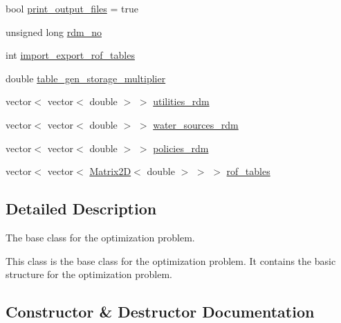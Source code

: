 \begin{DoxyCompactItemize}
bool \mbox{\hyperlink{classProblem_a3372a73270ce989f5d2056cace66215b_a3372a73270ce989f5d2056cace66215b}{print\+\_\+output\+\_\+files}} = true
\item 
unsigned long \mbox{\hyperlink{classProblem_a9e780729b6be5229c5bfa1e38c99cfa5_a9e780729b6be5229c5bfa1e38c99cfa5}{rdm\+\_\+no}}
\item 
int \mbox{\hyperlink{classProblem_ac5a286f34cec786a0ad56c77783a201c_ac5a286f34cec786a0ad56c77783a201c}{import\+\_\+export\+\_\+rof\+\_\+tables}}
\item 
double \mbox{\hyperlink{classProblem_a27cae146b3409021f6d5936404cd1083_a27cae146b3409021f6d5936404cd1083}{table\+\_\+gen\+\_\+storage\+\_\+multiplier}}
\item 
vector$<$ vector$<$ double $>$ $>$ \mbox{\hyperlink{classProblem_aa4f6db22580c8d8a941e83556f4f5208_aa4f6db22580c8d8a941e83556f4f5208}{utilities\+\_\+rdm}}
\item 
vector$<$ vector$<$ double $>$ $>$ \mbox{\hyperlink{classProblem_ace43e5306285f0d91a199a4bd5a38922_ace43e5306285f0d91a199a4bd5a38922}{water\+\_\+sources\+\_\+rdm}}
\item 
vector$<$ vector$<$ double $>$ $>$ \mbox{\hyperlink{classProblem_a63d49161a5d6d98e26cd218d90a13bae_a63d49161a5d6d98e26cd218d90a13bae}{policies\+\_\+rdm}}
\item 
vector$<$ vector$<$ \mbox{\hyperlink{classMatrix2D}{Matrix2D}}$<$ double $>$ $>$ $>$ \mbox{\hyperlink{classProblem_a0a64a8c04964a326879eccccf5437c93_a0a64a8c04964a326879eccccf5437c93}{rof\+\_\+tables}}
\end{DoxyCompactItemize}


\subsection{Detailed Description}
The base class for the optimization problem. 

This class is the base class for the optimization problem. It contains the basic structure for the optimization problem. 

\subsection{Constructor \& Destructor Documentation}
\mbox{\label{classProblem_afc35e409dbd47f3c457ccac358afbc2e_afc35e409dbd47f3c457ccac358afbc2e}} 
